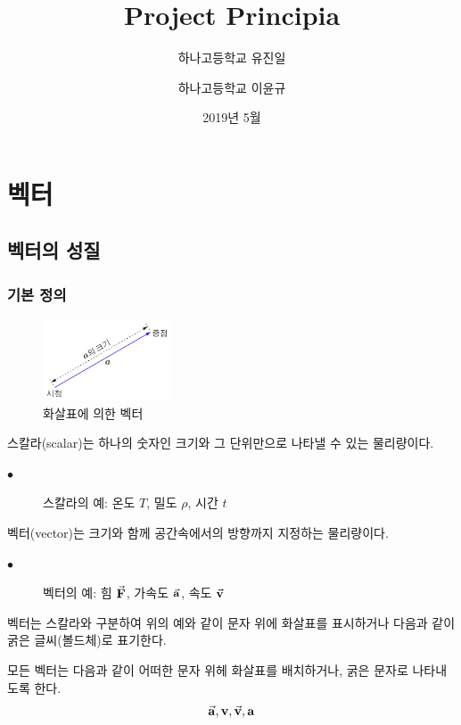\documentclass[a4paper,twoside,11pt]{book}
\title{Project Principia}
\author{하나고등학교 유진일
\and 하나고등학교 이윤규}
\date{2019년 5월}
\begin{document}
\maketitle


\tableofcontents

\chapter[\quad 벡터]{벡터}


\section{벡터의 성질}

\subsection{기본 정의}

\begin{figure}
  \centering
  \includegraphics[width=0.34\textwidth]{images/fig1-1}
  \caption{화살표에 의한 벡터}
  \label{fig:arrowvector}
\end{figure}

스칼라(scalar)는 하나의 숫자인 크기와 그 단위만으로 나타낼 수 있는 물리량이다.
\begin{description}\item[$\bullet$]{스칼라의 예:} 온도 $T$, 밀도 $\rho$, 시간 $t$ \end{description}
벡터(vector)는 크기와 함께 공간속에서의 방향까지 지정하는 물리량이다.
\begin{description}\item[$\bullet$]{벡터의 예:} 힘 $\va{F}$, 가속도 $\va{a}$, 속도 $\va{v}$ \end{description}

벡터는 스칼라와 구분하여 위의 예와 같이 문자 위에 화살표를 표시하거나 다음과 같이 굵은 글씨(볼드체)로 표기한다.

\begin{keypoint}
  모든 벡터는 다음과 같이 어떠한 문자 위헤 화살표를 배치하거나, 굵은 문자로 나타내도록 한다.
  $$\va{a}, \vb{v}, \va{v}, \vb{a}$$
\end{keypoint}
\end{document}
